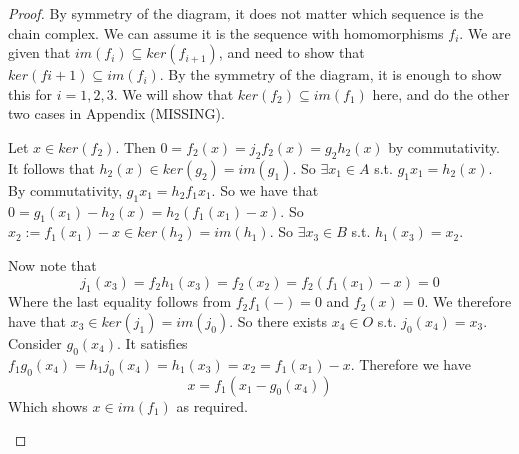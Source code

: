 \begin{proof}
By symmetry of the diagram, it does not matter which sequence is the chain complex. We can assume it is the sequence with homomorphisms $f_i$. We are given that $im(f_i)\subseteq ker(f_{i+1})$, and need to show that $ker(f{i+1})\subseteq im(f_i)$. By the symmetry of the diagram, it is enough to show this for $i=1,2,3$. We will show that $ker(f_2)\subseteq im(f_1)$ here, and do the other two cases in Appendix (MISSING).

Let $x\in ker(f_2)$. Then $0=f_2(x)=j_2f_2(x)=g_2h_2(x)$ by commutativity. It follows that $h_2(x)\in ker(g_2)=im(g_1)$. So $\exists x_1\in A$ s.t. $g_1 x_1=h_2(x)$. By commutativity, $g_1x_1=h_2f_1 x_1$. So we have that $0=g_1 (x_1)-h_2(x)=h_2(f_1 (x_1)-x)$. So $x_2:=f_1(x_1)-x\in ker(h_2)=im(h_1)$. So $\exists x_3\in B$ s.t. $h_1(x_3)=x_2$.

Now note that $$j_1(x_3)=f_2h_1(x_3)=f_2(x_2)=f_2(f_1(x_1)-x)=0$$
Where the last equality follows from $f_2f_1(-)=0$ and $f_2(x)=0$. We therefore have that $x_3\in ker(j_1)=im(j_0)$. So there exists $x_4\in O$ s.t. $j_0(x_4)=x_3$. Consider $g_0(x_4).$ It satisfies $f_1g_0(x_4)=h_1j_0(x_4)=h_1(x_3)=x_2=f_1(x_1)-x$. Therefore we have
$$x=f_1(x_1-g_0(x_4))$$
Which shows $x\in im(f_1)$ as required.

\cite{Eilenberg}
\end{proof}